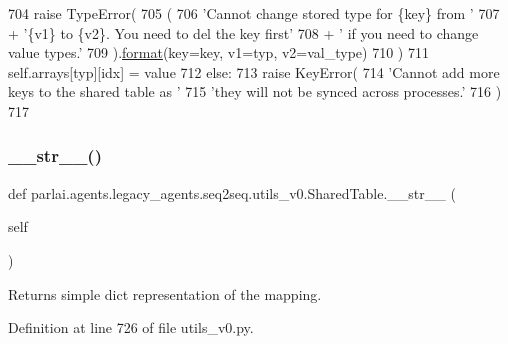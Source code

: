 \begin{DoxyCode}
704                 \textcolor{keywordflow}{raise} TypeError(
705                     (
706                         \textcolor{stringliteral}{'Cannot change stored type for \{key\} from '}
707                         + \textcolor{stringliteral}{'\{v1\} to \{v2\}. You need to del the key first'}
708                         + \textcolor{stringliteral}{' if you need to change value types.'}
709                     ).\hyperlink{namespaceparlai_1_1chat__service_1_1services_1_1messenger_1_1shared__utils_a32e2e2022b824fbaf80c747160b52a76}{format}(key=key, v1=typ, v2=val\_type)
710                 )
711             self.arrays[typ][idx] = value
712         \textcolor{keywordflow}{else}:
713             \textcolor{keywordflow}{raise} KeyError(
714                 \textcolor{stringliteral}{'Cannot add more keys to the shared table as '}
715                 \textcolor{stringliteral}{'they will not be synced across processes.'}
716             )
717 
\end{DoxyCode}
\mbox{\label{classparlai_1_1agents_1_1legacy__agents_1_1seq2seq_1_1utils__v0_1_1SharedTable_a678937ad3dcc29e6bda6898c6462950f}} 
\subsubsection{\texorpdfstring{\+\_\+\+\_\+str\+\_\+\+\_\+()}{\_\_str\_\_()}}
{\footnotesize\ttfamily def parlai.\+agents.\+legacy\+\_\+agents.\+seq2seq.\+utils\+\_\+v0.\+Shared\+Table.\+\_\+\+\_\+str\+\_\+\+\_\+ (\begin{DoxyParamCaption}\item[{}]{self }\end{DoxyParamCaption})}

\begin{DoxyVerb}Returns simple dict representation of the mapping.
\end{DoxyVerb}
 

Definition at line 726 of file utils\+\_\+v0.\+py.


